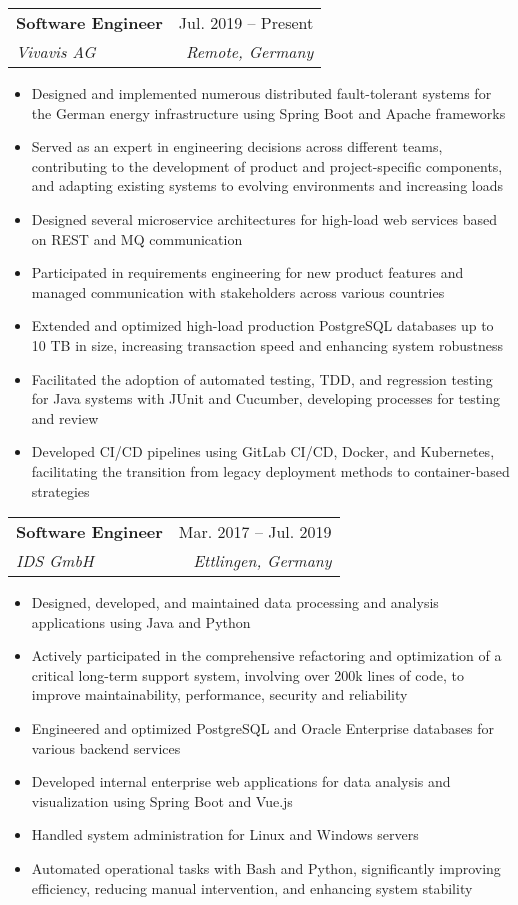 \documentclass[letterpaper,11pt]{article}
\makeatletter
\newcommand{\resumeItem}[1]{
  \item\small{
    {#1 \vspace{-2pt}}
  }
}
\newcommand{\resumeSubheading}[4]{
  \vspace{-2pt}\item
    \begin{tabular*}{0.97\textwidth}[t]{l@{\extracolsep{\fill}}r}
      \textbf{#1} & #2 \\
      \textit{\small#3} & \textit{\small #4} \\
    \end{tabular*}\vspace{-7pt}
}
\newcommand{\resumeSubSubheading}[2]{
    \item
    \begin{tabular*}{0.97\textwidth}{l@{\extracolsep{\fill}}r}
      \textit{\small#1} & \textit{\small #2} \\
    \end{tabular*}\vspace{-7pt}
}
\newcommand{\resumeSubHeadingListEnd}{\end{itemize}}
\newcommand{\resumeItemListStart}{\begin{itemize}}
\newcommand{\resumeItemListEnd}{\end{itemize}\vspace{-5pt}}
\makeatother
\begin{document}
    \resumeSubheading
      {Software Engineer}{Jul. 2019 -- Present}
      {Vivavis AG}{Remote, Germany}
      \resumeItemListStart
        \resumeItem{Designed and implemented numerous distributed fault-tolerant systems for the German energy infrastructure using Spring Boot and Apache frameworks}
        \resumeItem{Served as an expert in engineering decisions across different teams, contributing to the development of product and project-specific components, and adapting existing systems to evolving environments and increasing loads}
        \resumeItem{Designed several microservice architectures for high-load web services based on REST and MQ communication}
        \resumeItem{Participated in requirements engineering for new product features and managed communication with stakeholders across various countries}
        \resumeItem{Extended and optimized high-load production PostgreSQL databases up to 10 TB in size, increasing transaction speed and enhancing system robustness}
        \resumeItem{Facilitated the adoption of automated testing, TDD, and regression testing for Java systems with JUnit and Cucumber, developing processes for testing and review}
        \resumeItem{Developed CI/CD pipelines using GitLab CI/CD, Docker, and Kubernetes, facilitating the transition from legacy deployment methods to container-based strategies}

      \resumeItemListEnd
      

    \resumeSubheading
      {Software Engineer}{Mar. 2017 -- Jul. 2019}
      {IDS GmbH}{Ettlingen, Germany}
      \resumeItemListStart
        \resumeItem{Designed, developed, and maintained data processing and analysis applications using Java and Python}
        \resumeItem{Actively participated in the comprehensive refactoring and optimization of a critical long-term support system, involving over 200k lines of code, to improve maintainability, performance, security and reliability}
        \resumeItem{Engineered and optimized PostgreSQL and Oracle Enterprise databases for various backend services}
        \resumeItem{Developed internal enterprise web applications for data analysis and visualization using Spring Boot and Vue.js}
        \resumeItem{Handled system administration for Linux and Windows servers}
        \resumeItem{Automated operational tasks with Bash and Python, significantly improving efficiency, reducing manual intervention, and enhancing system stability}
    \resumeItemListEnd
\end{document}
